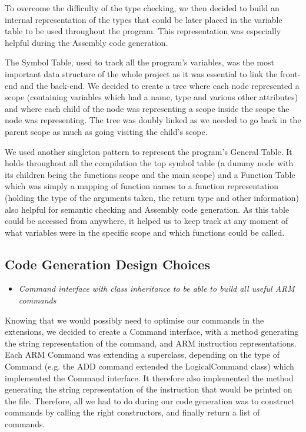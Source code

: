 \documentclass[a4wide, 11pt]{article}
\begin{document}
To overcome the difficulty of the type checking, we then decided to build an internal representation of the types that could be later placed in the variable table to be used throughout the program. This representation was especially helpful during the Assembly code generation.

\bigskip

The Symbol Table, used to track all the program's variables, was the most important data structure of the whole project as it was essential to link the front-end and the back-end. We decided to create a tree where each node represented a scope (containing variables which had a name, type and various other attributes) and where each child of the node was representing a scope inside the scope the node was representing. The tree was doubly linked as we needed to go back in the parent scope as much as going visiting the child’s scope. 

\bigskip

We used another singleton pattern to represent the program's General Table. It holds throughout all the compilation the top symbol table (a dummy node with its children being the functions scope and the main scope) and a Function Table which was simply a mapping of function names to a function representation (holding the type of the arguments taken, the return type and other information) also helpful for semantic checking and Assembly code generation. As this table could be accessed from anywhere, it helped us to keep track at any moment of what variables were in the specific scope and which functions could be called.


\subsection{Code Generation Design Choices}

\begin{itemize}
\item \textit{Command interface with class inheritance to be able to build all useful ARM commands}
\end{itemize}

Knowing that we would possibly need to optimise our commands in the extensions, we decided to create a Command interface, with a method generating the string representation of the command, and ARM instruction representations. Each ARM Command was extending a superclass, depending on the type of Command (e.g. the ADD command extended the LogicalCommand class) which implemented the Command interface. It therefore also implemented the method generating the string representation of the instruction that would be printed on the file. Therefore, all we had to do during our code generation was to construct commands by calling the right constructors, and finally return a list of commands. 
\end{document}
